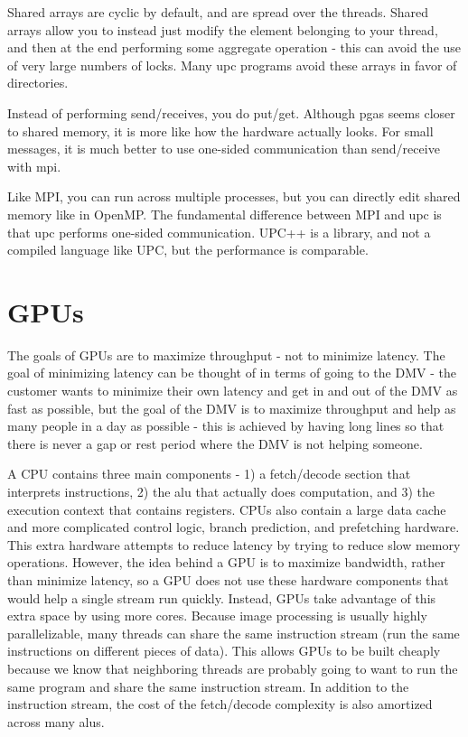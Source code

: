 \documentclass[10pt]{article}
\begin{document}
\begin{flushleft}
Shared arrays are cyclic by default, and are spread over the threads. Shared arrays allow you to instead just modify the element belonging to your thread, and then at the end performing some aggregate operation - this can avoid the use of very large numbers of locks. Many \gls{upc} programs avoid these arrays in favor of directories. 

Instead of performing send/receives, you do put/get. Although \gls{pgas} seems closer to shared memory, it is more like how the hardware actually looks. For small messages, it is much better to use one-sided communication than send/receive with \gls{mpi}.

Like MPI, you can run across multiple processes, but you can directly edit shared memory like in OpenMP.  The fundamental difference between MPI and \gls{upc} is that \gls{upc} performs one-sided communication. UPC++ is a library, and not a compiled language like UPC, but the performance is comparable. 



\section{GPUs}

The goals of GPUs are to maximize throughput - not to minimize latency. The goal of minimizing latency can be thought of in terms of going to the DMV - the customer wants to minimize their own latency and get in and out of the DMV as fast as possible, but the goal of the DMV is to maximize throughput and help as many people in a day as possible - this is achieved by having long lines so that there is never a gap or rest period where the DMV is not helping someone. 

A CPU contains three main components - 1) a fetch/decode section that interprets instructions, 2) the \gls{alu} that actually does computation, and 3) the execution context that contains registers. CPUs also contain a large data cache and more complicated control logic, branch prediction, and prefetching hardware. This extra hardware attempts to reduce latency by trying to reduce slow memory operations. However, the idea behind a GPU is to maximize bandwidth, rather than minimize latency, so a GPU does not use these hardware components that would help a single stream run quickly. Instead, GPUs take advantage of this extra space by using more cores. Because image processing is usually highly parallelizable, many threads can share the same instruction stream (run the same instructions on different pieces of data). This allows GPUs to be built cheaply because we know that neighboring threads are probably going to want to run the same program and share the same instruction stream. In addition to the instruction stream, the cost of the fetch/decode complexity is also amortized across many \gls{alu}s. 


\end{flushleft}
\end{document}
